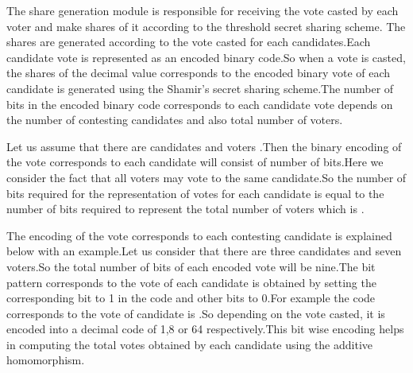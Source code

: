 \documentclass[conference]{IEEEtran}
\begin{document}
The share generation module is responsible for receiving the vote casted by each voter and make shares of it according to the threshold secret sharing scheme.
The shares are generated according to the vote casted for each candidates.Each candidate vote is represented as an encoded binary code.So when a vote is casted, the shares of the decimal value corresponds to the encoded binary vote of each candidate is generated using the Shamir's secret sharing scheme.The number of bits in the encoded binary code corresponds to each candidate vote depends on the number of contesting candidates and also total number of voters.

Let us assume that there are  candidates  and  voters .Then the binary encoding of the vote corresponds to each candidate will consist of  number of bits.Here we consider the fact that all voters may vote to the same candidate.So the number of bits required for the representation of votes for each candidate is equal to the number of bits required to represent the total number of voters which is .

The encoding of the vote corresponds to each contesting candidate is explained below with an example.Let us consider that there are three candidates and seven voters.So the total number of bits of each encoded vote will be nine.The bit pattern corresponds to the vote of each candidate is obtained by setting the corresponding bit  to 1 in the code  and other bits  to 0.For example the code corresponds to the vote of candidate  is .So depending on the vote casted, it is encoded into a decimal code of 1,8 or 64 respectively.This bit wise encoding helps in computing  the total votes obtained by each candidate using the additive homomorphism.
 
\end{document}
